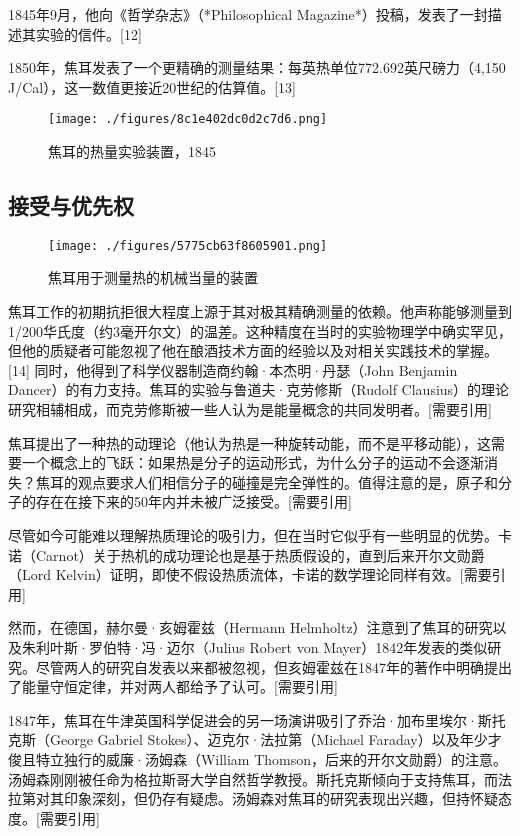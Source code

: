 1845年9月，他向《哲学杂志》（*Philosophical Magazine*）投稿，发表了一封描述其实验的信件。[12]  

1850年，焦耳发表了一个更精确的测量结果：每英热单位772.692英尺磅力（4,150 J/Cal），这一数值更接近20世纪的估算值。[13]
\begin{figure}[ht]
\centering
\texttt{[image: ./figures/8c1e402dc0d2c7d6.png]}
\caption{焦耳的热量实验装置，1845} \label{fig_JR_1}
\end{figure}
\subsection{接受与优先权}
\begin{figure}[ht]
\centering
\texttt{[image: ./figures/5775cb63f8605901.png]}
\caption{焦耳用于测量热的机械当量的装置} \label{fig_JR_2}
\end{figure}
焦耳工作的初期抗拒很大程度上源于其对极其精确测量的依赖。他声称能够测量到1/200华氏度（约3毫开尔文）的温差。这种精度在当时的实验物理学中确实罕见，但他的质疑者可能忽视了他在酿酒技术方面的经验以及对相关实践技术的掌握。[14] 同时，他得到了科学仪器制造商约翰·本杰明·丹瑟（John Benjamin Dancer）的有力支持。焦耳的实验与鲁道夫·克劳修斯（Rudolf Clausius）的理论研究相辅相成，而克劳修斯被一些人认为是能量概念的共同发明者。[需要引用]  

焦耳提出了一种热的动理论（他认为热是一种旋转动能，而不是平移动能），这需要一个概念上的飞跃：如果热是分子的运动形式，为什么分子的运动不会逐渐消失？焦耳的观点要求人们相信分子的碰撞是完全弹性的。值得注意的是，原子和分子的存在在接下来的50年内并未被广泛接受。[需要引用]  

尽管如今可能难以理解热质理论的吸引力，但在当时它似乎有一些明显的优势。卡诺（Carnot）关于热机的成功理论也是基于热质假设的，直到后来开尔文勋爵（Lord Kelvin）证明，即使不假设热质流体，卡诺的数学理论同样有效。[需要引用]  

然而，在德国，赫尔曼·亥姆霍兹（Hermann Helmholtz）注意到了焦耳的研究以及朱利叶斯·罗伯特·冯·迈尔（Julius Robert von Mayer）1842年发表的类似研究。尽管两人的研究自发表以来都被忽视，但亥姆霍兹在1847年的著作中明确提出了能量守恒定律，并对两人都给予了认可。[需要引用]

1847年，焦耳在牛津英国科学促进会的另一场演讲吸引了乔治·加布里埃尔·斯托克斯（George Gabriel Stokes）、迈克尔·法拉第（Michael Faraday）以及年少才俊且特立独行的威廉·汤姆森（William Thomson，后来的开尔文勋爵）的注意。汤姆森刚刚被任命为格拉斯哥大学自然哲学教授。斯托克斯倾向于支持焦耳，而法拉第对其印象深刻，但仍存有疑虑。汤姆森对焦耳的研究表现出兴趣，但持怀疑态度。[需要引用]  

